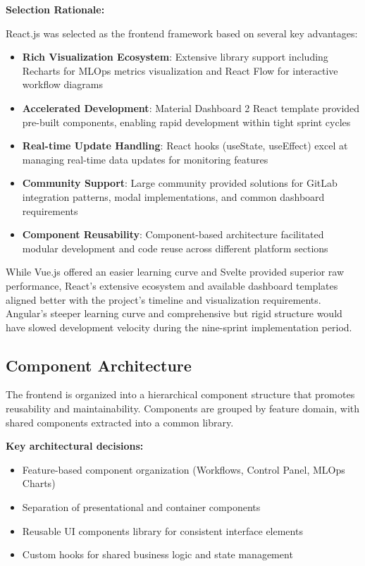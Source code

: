 \textbf{Selection Rationale:}

React.js was selected as the frontend framework based on several key advantages:

\begin{itemize}
    \item \textbf{Rich Visualization Ecosystem}: Extensive library support including Recharts for MLOps metrics visualization and React Flow for interactive workflow diagrams
    \item \textbf{Accelerated Development}: Material Dashboard 2 React template provided pre-built components, enabling rapid development within tight sprint cycles
    \item \textbf{Real-time Update Handling}: React hooks (useState, useEffect) excel at managing real-time data updates for monitoring features
    \item \textbf{Community Support}: Large community provided solutions for GitLab integration patterns, modal implementations, and common dashboard requirements
    \item \textbf{Component Reusability}: Component-based architecture facilitated modular development and code reuse across different platform sections
\end{itemize}

While Vue.js offered an easier learning curve and Svelte provided superior raw performance, React's extensive ecosystem and available dashboard templates aligned better with the project's timeline and visualization requirements. Angular's steeper learning curve and comprehensive but rigid structure would have slowed development velocity during the nine-sprint implementation period.

\subsection{Component Architecture}

The frontend is organized into a hierarchical component structure that promotes reusability and maintainability. Components are grouped by feature domain, with shared components extracted into a common library.

\textbf{Key architectural decisions:}
\begin{itemize}
    \item Feature-based component organization (Workflows, Control Panel, MLOps Charts)
    \item Separation of presentational and container components
    \item Reusable UI components library for consistent interface elements
    \item Custom hooks for shared business logic and state management
\end{itemize}

